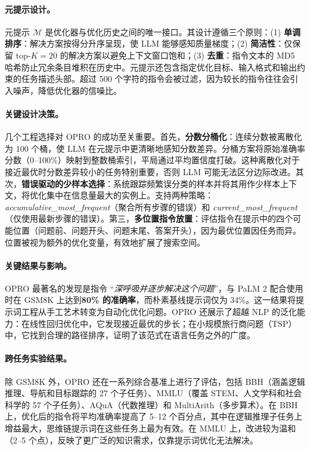 \paragraph{元提示设计。}
元提示 $\mathcal{M}$ 是优化器与优化历史之间的唯一接口。其设计遵循三个原则：(1) \textbf{单调排序}：解决方案按得分升序呈现，使 LLM 能够感知质量梯度；(2) \textbf{简洁性}：仅保留 top-$K=20$ 的解决方案以避免上下文窗口饱和；(3) \textbf{去重}：指令文本的 MD5 哈希防止冗余条目堆积在历史中。元提示还包含指定优化目标、输入格式和输出约束的任务描述头部。超过 500 个字符的指令会被过滤，因为较长的指令往往会引入噪声，降低优化器的信噪比。

\paragraph{关键设计决策。}
几个工程选择对 OPRO 的成功至关重要。首先，\textbf{分数分桶化}：连续分数被离散化为 100 个桶，使 LLM 在元提示中更清晰地感知分数差异。分桶方案将原始准确率分数（0--100\%）映射到整数桶索引，平局通过平均置信度打破。这种离散化对于接近最优时分数差异较小的任务特别重要，否则 LLM 可能无法区分边际改进。其次，\textbf{错误驱动的少样本选择}：系统跟踪频繁误分类的样本并将其用作少样本上下文，将优化集中在信息量最大的实例上。支持两种策略：\textit{accumulative\_most\_frequent}（聚合所有步骤的错误）和 \textit{current\_most\_frequent}（仅使用最新步骤的错误）。第三，\textbf{多位置指令放置}：评估指令在提示中的四个可能位置（问题前、问题开头、问题末尾、答案开头），因为最优位置因任务而异。位置被视为额外的优化变量，有效地扩展了搜索空间。

\paragraph{关键结果与影响。}
OPRO 最著名的发现是指令 ``\textit{深呼吸并逐步解决这个问题}''，与 PaLM 2 配合使用时在 GSM8K 上达到\textbf{80\% 的准确率}，而朴素基线提示词仅为 34\%。这一结果将提示词工程从手工艺术转变为自动化优化问题。OPRO 还展示了超越 NLP 的泛化能力：在线性回归优化中，它发现接近最优的步长；在小规模旅行商问题（TSP）中，它找到合理的路径排序，证明了该范式在语言任务之外的广度。

\paragraph{跨任务实验结果。}
除 GSM8K 外，OPRO 还在一系列综合基准上进行了评估，包括 BBH（涵盖逻辑推理、导航和目标跟踪的 27 个子任务）、MMLU（覆盖 STEM、人文学科和社会科学的 57 个子任务）、AQuA（代数推理）和 MultiArith（多步算术）。在 BBH 上，优化后的指令将平均准确率提高了 5--12 个百分点，其中在逻辑推理子任务上增益最大，思维链提示词在这些任务上最为有效。在 MMLU 上，改进较为温和（2--5 个点），反映了更广泛的知识需求，仅靠提示词优化无法解决。

